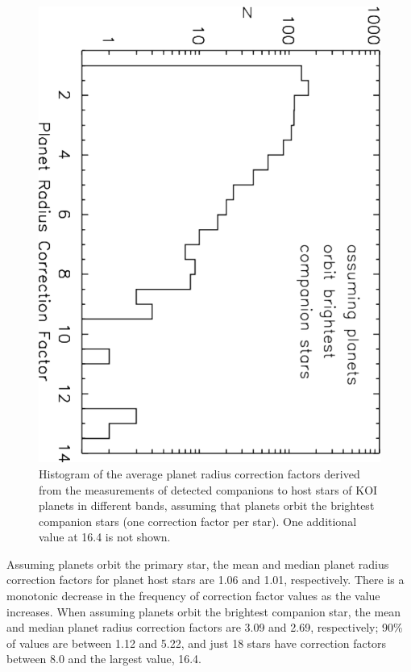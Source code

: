 \documentclass[twocolumn,appendixfloats]{aastex6}
\begin{document}
\begin{figure}[!]
\centering
\includegraphics[angle=90,scale=0.4]{KOI_Prad_correction_factors_secondary_histo.pdf}
\caption{Histogram of the average planet radius correction factors derived
from the measurements of detected companions to host stars of KOI
planets in different bands, assuming that planets orbit the brightest
companion stars (one correction factor per star). One additional value at
16.4 is not shown.
\label{KOI_Prad_correction2}}
\end{figure}

Assuming planets orbit the primary star, the mean and median planet radius
correction factors for planet host stars are 1.06 and 1.01, respectively. 
There is a monotonic decrease in the frequency of correction factor values as 
the value increases. When assuming planets orbit the brightest companion
star, the mean and median planet radius correction factors are 3.09 and
2.69, respectively; 90\% of values are between 1.12 and 5.22, and just 
18 stars have correction factors between 8.0 and the largest value,
16.4.
\end{document}
